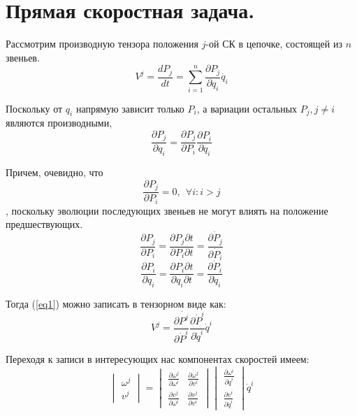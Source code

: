 \section{Прямая скоростная задача.}

Рассмотрим производную тензора положения $j$-ой СК в цепочке, состоящей из $n$ звеньев.
\begin{equation}\label{eq1}
V^j = \frac{dP_j}{dt} = \sum_{i=1}^{n}\frac{\partial{P_j}}{\partial{q_i}}\dot{q_i} 
\end{equation}

Поскольку от $q_i$ напрямую зависит только $P_i$, а вариации остальных $P_j, j \neq i$ являются производными,
\begin{equation}\label{}
\frac{\partial{P_j}}{\partial{q_i}} = \frac{\partial{P_j}}{\partial{P_i}}\frac{\partial{P_i}}{\partial{q_i}}
\end{equation}

Причем, очевидно, что 
\begin{equation}\label{}
\frac{\partial{P_j}}{\partial{P_i}} = 0, \ \ \forall i: i > j
\end{equation}
, поскольку эволюции последующих звеньев не могут влиять на положение предшествующих.
\begin{equation}\label{}
\frac{\partial{P_j}}{\partial{P_i}} = \frac{\partial{P_j}\partial{t}}{\partial{P_i}\partial{t}} = \frac{\partial{\dot{P}_j}}{\partial{\dot{P}_i}}
\end{equation}
\begin{equation}\label{}
\frac{\partial{P_i}}{\partial{q_i}} = \frac{\partial{P_i}\partial{t}}{\partial{q_i}\partial{t}} = \frac{\partial{\dot{P}_i}}{\partial{\dot{q}_i}}
\end{equation}

Тогда (\ref{eq1}) можно записать в тензорном виде как:
\begin{equation}\label{eq2}
V^j = \frac{\partial{\dot{P^j}}}{\partial{\dot{P}^i}}\frac{\partial{\dot{P}^i}}{\partial{\dot{q}^i}}\dot{q}^i 
\end{equation}

Переходя к записи в интересующих нас компонентах скоростей имеем:
\begin{equation}\label{matrix_spd_eq}
\begin{vmatrix}
\omega^j\\
v^j
\end{vmatrix}
=
\begin{vmatrix}
\frac{\partial{\omega^j}}{\partial{\omega^i}} & \frac{\partial{\omega^j}}{\partial{v^i}} \\
\frac{\partial{v^j}}{\partial{\omega^i}} & \frac{\partial{v^j}}{\partial{v^i}}
\end{vmatrix}
\begin{vmatrix}
\frac{\partial{\omega^i}}{\partial{\dot{q}^i}}\\
\frac{\partial{v^i}}{\partial{\dot{q}^i}}
\end{vmatrix}
\dot{q}^i
\end{equation}


